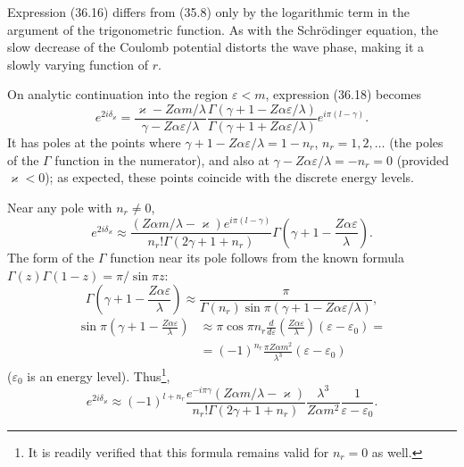 Expression (36.16) differs from (35.8) only by the logarithmic term in the argument of the trigonometric function. As with the Schrödinger equation, the slow decrease of the Coulomb potential distorts the wave phase, making it a slowly varying function of $r$.

On analytic continuation into the region $\varepsilon<m$, expression (36.18) becomes
\begin{equation}
e^{2i\delta_\varkappa}
=\frac{\varkappa-Z\alpha m/\lambda}{\gamma-Z\alpha\varepsilon/\lambda}
\frac{\Gamma(\gamma+1-Z\alpha\varepsilon/\lambda)}
{\Gamma(\gamma+1+Z\alpha\varepsilon/\lambda)}e^{i\pi(l-\gamma)}.
\tag{36.20}
\end{equation}
It has poles at the points where $\gamma+1-Z\alpha\varepsilon/\lambda=1-n_r$, $n_r=1,2,\ldots$ (the poles of the $\Gamma$ function in the numerator), and also at $\gamma-Z\alpha\varepsilon/\lambda=-n_r=0$ (provided $\varkappa<0$); as expected, these points coincide with the discrete energy levels.

Near any pole with $n_r\ne0$,
\[
e^{2i\delta_\varkappa}\approx
\frac{(Z\alpha m/\lambda-\varkappa)e^{i\pi(l-\gamma)}}
{n_r!\Gamma(2\gamma+1+n_r)}
\Gamma\left(\gamma+1-\frac{Z\alpha\varepsilon}{\lambda}\right).
\]
The form of the $\Gamma$ function near its pole follows from the known formula $\Gamma(z)\Gamma(1-z)=\pi/\sin\pi z$:
\[
\Gamma\left(\gamma+1-\frac{Z\alpha\varepsilon}{\lambda}\right)
\approx\frac\pi{\Gamma(n_r)\sin\pi(\gamma+1-Z\alpha\varepsilon/\lambda)},
\]
\[
\begin{aligned}
\sin\pi\left(\gamma+1-\frac{Z\alpha\varepsilon}{\lambda}\right)
&\approx\pi\cos\pi n_r\frac d{d\varepsilon}
\left(\frac{Z\alpha\varepsilon}{\lambda}\right)(\varepsilon-\varepsilon_0)={}\\
&=(-1)^{n_r}\frac{\pi Z\alpha m^2}{\lambda^3}(\varepsilon-\varepsilon_0)
\end{aligned}
\]
($\varepsilon_0$ is an energy level). Thus\footnote{It is readily verified that this formula remains valid for $n_r=0$ as well.},
\begin{equation}
e^{2i\delta_\varkappa}\approx(-1)^{l+n_r}
\frac{e^{-i\pi\gamma}(Z\alpha m/\lambda-\varkappa)}
{n_r!\Gamma(2\gamma+1+n_r)}
\frac{\lambda^3}{Z\alpha m^2}\frac1{\varepsilon-\varepsilon_0}.
\tag{36.21}
\end{equation}

